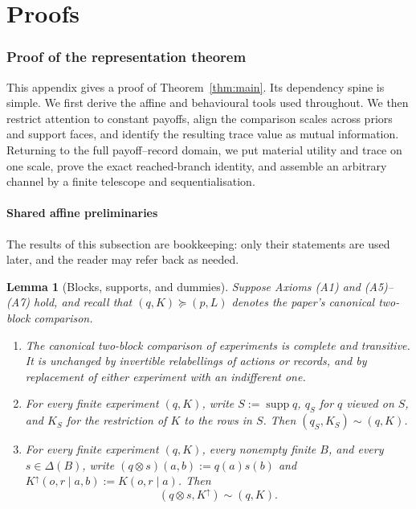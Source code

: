 \documentclass[11pt,a4paper]{article}
\newtheorem{lemma}[theorem]{Lemma}
\theoremstyle{definition}
\newcommand{\D}{\Delta}
\newcommand{\supp}{\operatorname{supp}}
\newcommand{\1}{\mathbf 1}
\begin{document}
\clearpage
\appendix

\part*{Proofs}

\section{Proof of the representation theorem}
\label{app:main-proof}

This appendix gives a proof of Theorem~\ref{thm:main}.  Its
dependency spine is simple.  We first derive the affine and behavioural tools
used throughout.  We then restrict attention to constant payoffs, align the
comparison scales across priors and support faces, and identify the resulting
trace value as mutual information.  Returning to the full payoff--record
domain, we put material utility and trace on one scale, prove the exact
reached-branch identity, and assemble an arbitrary channel by a finite
telescope and sequentialisation.


\subsection{Shared affine preliminaries}


The results of this subsection are bookkeeping: only
their statements are used later, and the reader may refer back as needed.


\begin{lemma}[Blocks, supports, and dummies]\label{lf:lem:bookkeeping}
Suppose Axioms \textup{(A1)} and \textup{(A5)--(A7)} hold, and recall that
$(q,K)\succeq(p,L)$ denotes the paper's canonical two-block comparison.
\begin{enumerate}[label=\textup{(\alph*)},leftmargin=*]
\item The canonical two-block comparison of experiments is complete and
  transitive.  It is unchanged by invertible relabellings of actions or
  records, and by replacement of either experiment with an indifferent one.
\item For every finite experiment $(q,K)$, write $S:=\supp q$, $q_S$ for $q$
  viewed on $S$, and $K_S$ for the restriction of $K$ to the rows in $S$.
  Then $(q_S,K_S)\sim(q,K)$.
\item For every finite experiment $(q,K)$, every nonempty finite $B$, and
  every $s\in\D(B)$, write $(q\otimes s)(a,b):=q(a)s(b)$ and
  $K^\uparrow(o,r\mid a,b):=K(o,r\mid a)$.  Then
  \begin{equation}
  (q\otimes s,K^\uparrow)\sim(q,K).
  \label{lf:eq:dummy-ordinal}
  \end{equation}
\end{enumerate}
\end{lemma}
\end{document}
